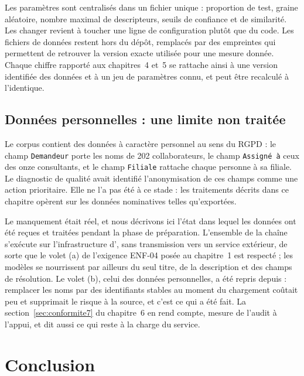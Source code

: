 Les paramètres sont centralisés dans un fichier unique : proportion de test, graine aléatoire,
nombre maximal de descripteurs, seuils de confiance et de similarité. Les changer revient à toucher
une ligne de configuration plutôt que du code. Les fichiers de données restent hors du dépôt,
remplacés par des empreintes qui permettent de retrouver la version exacte utilisée pour une mesure
donnée. Chaque chiffre rapporté aux chapitres~4 et~5 se rattache ainsi à une version identifiée des
données et à un jeu de paramètres connu, et peut être recalculé à l'identique.

\subsection{Données personnelles : une limite non traitée}
\label{sec:rgpd}

Le corpus contient des données à caractère personnel au sens du RGPD : le champ \texttt{Demandeur}
porte les noms de 202 collaborateurs, le champ \texttt{Assigné à} ceux des onze consultants, et le
champ \texttt{Filiale} rattache chaque personne à sa filiale. Le diagnostic de qualité avait
identifié l'anonymisation de ces champs comme une action prioritaire. Elle ne l'a pas été à ce
stade : les traitements décrits dans ce chapitre opèrent sur les données nominatives telles
qu'exportées.

Le manquement était réel, et nous décrivons ici l'état dans lequel les données ont été reçues et
traitées pendant la phase de préparation. L'ensemble de la chaîne s'exécute sur l'infrastructure
d'\OTBS, sans transmission vers un service extérieur, de sorte que le volet (a) de l'exigence
ENF-04 posée au chapitre~1 est respecté ; les modèles se nourrissent par ailleurs du seul titre, de
la description et des champs de résolution. Le volet (b), celui des données personnelles, a été
repris depuis : remplacer les noms par des identifiants stables au moment du chargement coûtait
peu et supprimait le risque à la source, et c'est ce qui a été fait. La
section~\ref{sec:conformite7} du chapitre~6 en rend compte, mesure de l'audit à l'appui, et dit
aussi ce qui reste à la charge du service.

\FloatBarrier

\section*{Conclusion}

